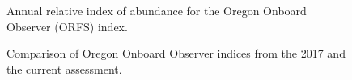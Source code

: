 \documentclass[
]{scrartcl}
\begin{document}
\begin{figure}


\caption{\label{fig-ORFS_index}Annual relative index of abundance for
the Oregon Onboard Observer (ORFS) index.}

\end{figure}%

\begin{figure}


\caption{\label{fig-ORFS_comp}Comparison of Oregon Onboard Observer
indices from the 2017 and the current assessment.}

\end{figure}%
\end{document}
